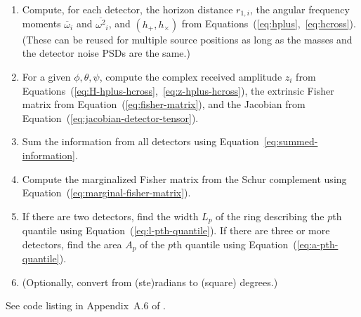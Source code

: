 \documentclass[amsmath,amssymb,aps,prx,reprint,nopreprintnumbers,nofootinbib]{revtex4-1}
\begin{document}
\begin{enumerate}
    \item Compute, for each detector, the horizon distance $r_{1,i}$, the angular frequency moments ${\overline{\omega}}_i$ and ${\overline{\omega^2}}_i$, and $(h_+, h_\times)$ from Equations~(\ref{eq:hplus},~\ref{eq:hcross}). (These can be reused for multiple source positions as long as the masses and the detector noise \acp{PSD} are the same.)
    \item For a given $\phi, \theta, \psi$, compute the complex received amplitude $z_i$ from Equations~(\ref{eq:H-hplus-hcross},~\ref{eq:z-hplus-hcross}), the extrinsic Fisher matrix from Equation~(\ref{eq:fisher-matrix}), and the Jacobian from Equation~(\ref{eq:jacobian-detector-tensor}).
    \item Sum the information from all detectors using Equation~\ref{eq:summed-information}.
    \item Compute the marginalized Fisher matrix from the Schur complement using Equation~(\ref{eq:marginal-fisher-matrix}).
    \item If there are two detectors, find the width $L_p$ of the ring describing the $p$th quantile using Equation~(\ref{eq:l-pth-quantile}). If there are three or more detectors, find the area $A_p$ of the $p$th quantile using Equation~(\ref{eq:a-pth-quantile}).
    \item (Optionally, convert from (ste)radians to (square) degrees.)
\end{enumerate}

See code listing in Appendix~A.6 of \cite{leo-singer-thesis}.


\end{document}
